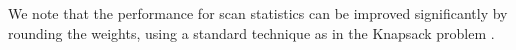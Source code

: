 We note that the performance for scan statistics can be improved significantly by rounding the weights, using a standard technique as in the Knapsack problem \cite{cadena:bigdata17}.


